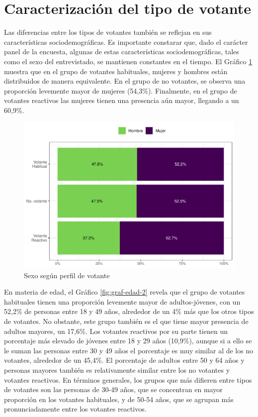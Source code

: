 \documentclass[
  12pt,
]{book}
\begin{document}
\hypertarget{caracterizaciuxf3n-del-tipo-de-votante}{%
\section{Caracterización del tipo de votante}\label{caracterizaciuxf3n-del-tipo-de-votante}}

Las diferencias entre los tipos de votantes también se reflejan en sus características sociodemográficas. Es importante constarar que, dado el carácter panel de la encuesta, algunas de estas características sociodemográficas, tales como el sexo del entrevistado, se mantienen constantes en el tiempo. El Gráfico \ref{fig:graf-sexo-2} muestra que en el grupo de votantes habituales, mujeres y hombres están distribuidos de manera equivalente. En el grupo de no votantes, se observa una proporción levemente mayor de mujeres (54,3\%). Finalmente, en el grupo de votantes reactivos las mujeres tienen una presencia aún mayor, llegando a un 60,9\%.

\begin{figure}

{\centering \includegraphics{reporte-elsoc_files/figure-latex/graf-sexo-2-1} 

}

\caption{Sexo según perfil de votante}\label{fig:graf-sexo-2}
\end{figure}

En materia de edad, el Gráfico \ref{fig:graf-edad-2} revela que el grupo de votantes habituales tienen una proporción levemente mayor de adultos-jóvenes, con un 52,2\% de personas entre 18 y 49 años, alrededor de un 4\% más que los otros tipos de votantes. No obstante, este grupo también es el que tiene mayor presencia de adultos mayores, un 17,6\%. Los votantes reactivos por su parte tienen un porcentaje más elevado de jóvenes entre 18 y 29 años (10,9\%), aunque si a ello se le suman las personas entre 30 y 49 años el porcentaje es muy similar al de los no votantes, alrededor de un 45,4\%. El porcentaje de adultos entre 50 y 64 años y personas mayores también es relativamente similar entre los no votantes y votantes reactivos. En términos generales, los grupos que más difieren entre tipos de votantes son las personas de 30-49 años, que se concentran en mayor proporción en los votantes habituales, y de 50-54 años, que se agrupan más pronunciadamente entre los votantes reactivos.
\end{document}
